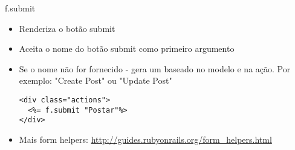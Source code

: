 \begin{frame}[t, fragile]{f.submit}
	\begin{itemize}
		\item Renderiza o botão \alert{submit} 
		\item Aceita o \alert{nome} do botão submit como primeiro argumento
		\item Se o nome não for fornecido - gera um baseado no modelo e na ação. Por exemplo:
			"Create Post" ou "Update Post" 
			\begin{lstlisting}[style=RubyInputStyle]
<div class="actions">
  <%= f.submit "Postar"%>
</div>			
			\end{lstlisting}	
		\item Mais form helpers: \url{http://guides.rubyonrails.org/form_helpers.html}	
	\end{itemize}	
\end{frame}
